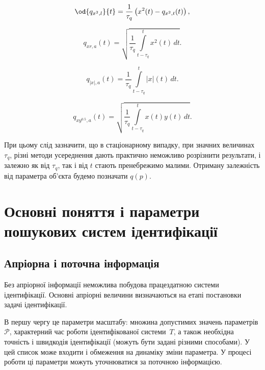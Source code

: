 \begin{equation}
\od{q_{x^2,l}}{t}
=
\frac{1}{\tau_q} \left( x^2(t) - q_{x^2,t}(t) \right)
,
\label{atu:eq:qx2l}
\end{equation}

\begin{equation}
  q_{xr,a}(t) =
  \sqrt{
    \frac{1}{\tau_q}
    \int\limits_{t-\tau_q}^{t} x^2(t) \, dt
  }.
  \label{atu:eq:qxra}
\end{equation}

\begin{equation}
  q_{|x|,a}(t) =
  \frac{1}{\tau_q}
  \int\limits_{t-\tau_q}^{t} |x|(t) \, dt
  .
  \label{atu:eq:qxma}
\end{equation}

\begin{equation}
  q_{xy^{0.5},a}(t) =
  \sqrt{
    \frac{1}{\tau_q}
    \int\limits_{t-\tau_q}^{t} x(t)y(t) \, dt
  }
  .
  \label{atu:eq:qxy05a}
\end{equation}

При цьому слід зазначити, що в стаціонарному випадку, при значних
величинах
$ \tau_q $, різні методи усереднення дають практично неможливо
розрізнити результати, і залежно як від
$ \tau_q $, так і від
$ t $ стають пренебрежимо малими. Отриману залежність від
параметра об'єкта будемо позначати
$q(p)$.





\section{Основні поняття і параметри пошукових систем ідентифікації}%

\subsection{Апріорна і поточна інформація}%

Без апріорної інформації неможлива побудова працездатною системи ідентифікації.
Основні апріорні величини визначаються на етапі постановки задачі
ідентифікації.

В першу чергу це параметри масштабу: множина допустимих значень
параметрів \label{atu:d:p_set} \(\mathcal{P} \), характерний час роботи
ідентифікованої системи~$T$,
а також необхідна точність і швидкодія ідентифікації (можуть
бути задані різними способами). У цей список може входити і
обмеження на динаміку зміни параметра. У процесі роботи ці
параметри можуть уточнюватися за поточною інформацією.

